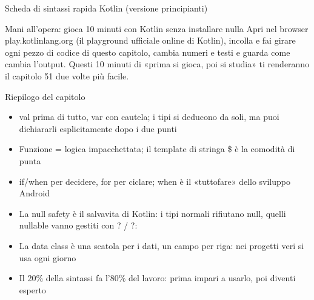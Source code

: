 \begin{center}\small\color{gray}Scheda di sintassi rapida Kotlin (versione principianti)\end{center}

\begin{tcbpractice}{Mani all'opera: gioca 10 minuti con Kotlin senza installare nulla}
Apri nel browser play.kotlinlang.org (il playground ufficiale online di Kotlin), incolla e fai girare ogni pezzo di codice di questo capitolo, cambia numeri e testi e guarda come cambia l'output. Questi 10 minuti di «prima si gioca, poi si studia» ti renderanno il capitolo 51 due volte più facile.

\end{tcbpractice}

\begin{tcbsummary}{Riepilogo del capitolo}
\begin{itemize}
  \item val prima di tutto, var con cautela; i tipi si deducono da soli, ma puoi dichiararli esplicitamente dopo i due punti
  \item Funzione = logica impacchettata; il template di stringa \$ è la comodità di punta
  \item if/when per decidere, for per ciclare; when è il «tuttofare» dello sviluppo Android
  \item La null safety è il salvavita di Kotlin: i tipi normali rifiutano null, quelli nullable vanno gestiti con ? / ?:
  \item La data class è una scatola per i dati, un campo per riga: nei progetti veri si usa ogni giorno
  \item Il 20\% della sintassi fa l'80\% del lavoro: prima impari a usarlo, poi diventi esperto
\end{itemize}

\end{tcbsummary}
